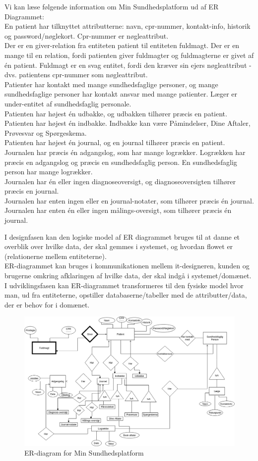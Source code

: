 Vi kan læse følgende information om Min Sundhedsplatform ud af ER Diagrammet:\\
En patient har tilknyttet attributterne: navn, cpr-nummer, kontakt-info, historik og password/nøglekort. Cpr-nummer er nøgleattribut.\\
Der er en giver-relation fra entiteten patient til entiteten fuldmagt. Der er en mange til en relation, fordi patienten giver fuldmagter og fuldmagterne er givet af én patient. Fuldmagt er en svag entitet, fordi den kræver sin ejers nøgleattribut - dvs. patientens cpr-nummer som nøgleattribut. \\
Patienter har kontakt med mange sundhedsfaglige personer, og mange sundhedsfaglige personer har kontakt ansvar med mange patienter. Læger er under-entitet af sundhedsfaglig personale. \\
Patienten har højest én udbakke, og udbakken tilhører præcis en patient.\\
Patienten har højest én indbakke. Indbakke kan være Påmindelser, Dine Aftaler, Prøvesvar og Spørgeskema.\\
Patienten har højest én journal, og en journal tilhører præcis en patient. \\
Journalen har præcis én adgangslog, som har mange logrækker. Logrækken har præcis en adgangslog og præcis en sundhedsfaglig person. En sundhedsfaglig person har mange logrækker.\\
Journalen har én eller ingen diagnoseoversigt, og diagnoseoversigten tilhører præcis en journal.\\
Journalen har enten ingen eller en journal-notater, som tilhører præcis én journal.\\
Journalen har enten én eller ingen målings-oversigt, som tilhører præcis én journal.

I designfasen kan den logiske model af ER diagrammet bruges til at danne et overblik over hvilke data, der skal gemmes i systemet, og hvordan flowet er (relationerne mellem entiteterne).\\
ER-diagrammet kan bruges i kommunikationen mellem it-designeren, kunden og brugerne omkring afklaringen af hvilke data, der skal indgå i systemet/domænet. \\
I udviklingsfasen kan ER-diagrammet transformeres til den fysiske model hvor man, ud fra entiteterne, opstiller databaserne/tabeller med de attributter/data, der er behov for i domænet.

\begin{figure}[H]
  \centering
  \includegraphics[angle=90, height=0.9\textheight]{Materials/ER-diagram.png}
  \caption{ER-diagram for Min Sundhedsplatform}
  \label{fig:ER}
\end{figure}
